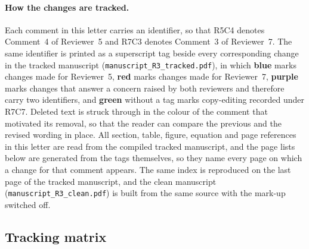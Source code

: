 \documentclass[11pt,a4paper]{article}
\begin{document}
\paragraph{How the changes are tracked.} Each comment in this letter carries an identifier, so that R5C4 denotes Comment~4 of Reviewer~5 and R7C3 denotes Comment~3 of Reviewer~7. The same identifier is printed as a superscript tag beside every corresponding change in the tracked manuscript (\texttt{manuscript\_R3\_tracked.pdf}), in which \textcolor{rvFive}{\textbf{blue}} marks changes made for Reviewer~5, \textcolor{rvSeven}{\textbf{red}} marks changes made for Reviewer~7, \textcolor{rvBoth}{\textbf{purple}} marks changes that answer a concern raised by both reviewers and therefore carry two identifiers, and \textcolor{rvEdit}{\textbf{green}} without a tag marks copy-editing recorded under R7C7. Deleted text is struck through in the colour of the comment that motivated its removal, so that the reader can compare the previous and the revised wording in place. All section, table, figure, equation and page references in this letter are read from the compiled tracked manuscript, and the page lists below are generated from the tags themselves, so they name every page on which a change for that comment appears. The same index is reproduced on the last page of the tracked manuscript, and the clean manuscript (\texttt{manuscript\_R3\_clean.pdf}) is built from the same source with the mark-up switched off.

\subsection*{Tracking matrix}
\end{document}
